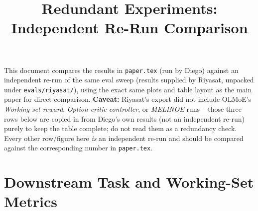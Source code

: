 \documentclass{article}
\title{Redundant Experiments: Independent Re-Run Comparison}
\author{}
\date{}
\begin{document}
\maketitle

\noindent This document compares the results in \texttt{paper.tex} (run by Diego) against
an independent re-run of the same eval sweep (results supplied by Riyasat, unpacked under
\texttt{evals/riyasat/}), using the exact same plots and table layout as the main paper for
direct comparison. \textbf{Caveat:} Riyasat's export did not include OLMoE's
\emph{Working-set reward}, \emph{Option-critic controller}, or \emph{MELINOE} runs -- those
three rows below are copied in from Diego's own results (not an independent re-run) purely
to keep the table complete; do not read them as a redundancy check. Every other row/figure
here \emph{is} an independent re-run and should be compared against the corresponding
number in \texttt{paper.tex}.

\section{Downstream Task and Working-Set Metrics}

\begin{table}[h]
\centering
\small
\caption{Phi-tiny-MoE-instruct, redundant run (1024 held-out prompts, $c=4$, top-2). Base
row is absolute; other rows are $\Delta$ from this run's own base model. Compare against
Table~1 of \texttt{paper.tex}.}
\end{table}
\end{document}
